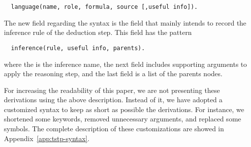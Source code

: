 \documentclass[../main.tex]{subfiles}
\begin{document}
\begin{verbatim}
  language(name, role, formula, source [,useful info]).
\end{verbatim}

The new field regarding the \TPTP syntax is the  field
that mainly intends to record the inference rule of the deduction step.
This field has the pattern

\begin{verbatim}
  inference(rule, useful info, parents).
\end{verbatim}

where the  is the inference name, the next field
includes supporting arguments to apply the reasoning step, and the
last field is a list of the parents nodes.

For increasing the readability of this paper, we are not presenting
these \TSTP derivations using the above description. Instead of it, we
have adopted a customized \TSTP syntax to keep as short as possible
the \Metis derivations. For instance,  we shortened some keywords,
removed unnecessary arguments, and replaced some symbols.
The complete description of these customizations are showed in Appendix~\ref{app:tstp-syntax}.
\end{document}
